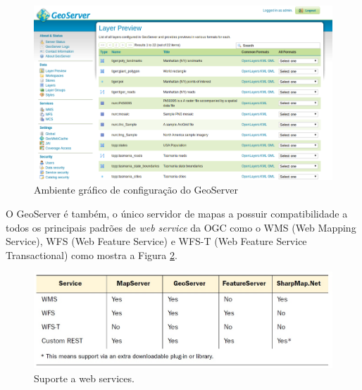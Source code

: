 		\begin{figure}
			\centering
			\includegraphics[width=1\linewidth]{data/geoserver_gui}
			\caption{Ambiente gráfico de configuração do GeoServer}
			\label{fig:geoservergui}
		\end{figure}
	
		O GeoServer é também, o único servidor de mapas a possuir compatibilidade a todos os principais padrões de \textit{web service} da OGC como o WMS (Web Mapping Service), WFS (Web Feature Service) e WFS-T (Web Feature Service Transactional) como mostra a Figura \ref{fig:suportewebservices}.
		
		\begin{figure}
			\centering
			\includegraphics[width=1\linewidth]{data/suporte_webservices}
			\caption{Suporte a web services. \cite{OBE_etal11}}
			\label{fig:suportewebservices}
		\end{figure}
		
